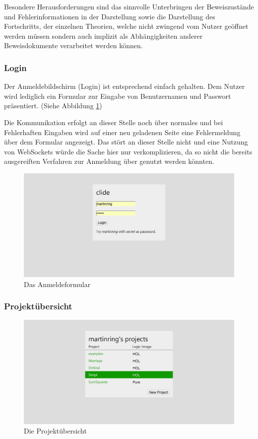 Besondere Herausforderungen sind das sinnvolle Unterbringen der Beweiszustände und
Fehlerinformationen in der Darstellung sowie die Darstellung des Fortschritts, der einzelnen
Theorien, welche nicht zwingend vom Nutzer geöffnet werden müssen sondern auch implizit als
Abhängigkeiten anderer Beweisdokumente verarbeitet werden können.

\subsubsection{Login}

Der Anmeldebildschirm (Login) ist entsprechend einfach gehalten. Dem Nutzer wird lediglich ein
Formular zur Eingabe von Benutzernamen und Passwort präsentiert. (Siehe Abbildung 
\ref{fig:screen-login})

Die Kommunikation erfolgt an dieser Stelle noch über normales  und bei Fehlerhaften
Eingaben wird auf einer neu geladenen Seite eine Fehlermeldung über dem Formular angezeigt. Das
stört an dieser Stelle nicht und eine Nutzung von WebSockets würde die Sache hier nur
verkomplizieren, da so nicht die bereits ausgereiften Verfahren zur Anmeldung über 
genutzt werden könnten.

\begin{figure}[ht]
\includegraphics[width=\linewidth]{images/screen-login}
  \caption{Das Anmeldeformular}
  \label{fig:screen-login}
\end{figure}

\subsubsection{Projektübersicht}

\begin{figure}[ht]
\includegraphics[width=\linewidth]{images/screen-projects}
  \caption{Die Projektübersicht}
  \label{fig:screen-projects}
\end{figure}

